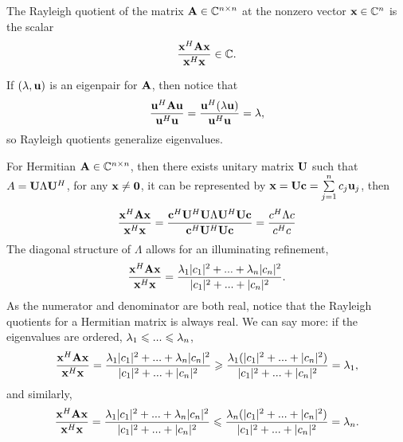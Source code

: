 \begin{definition}{}{}
    The Rayleigh quotient of the matrix $\bold{A}\in \mathbb{C}^{n\times n}$ at the nonzero vector $\bold{x}\in \mathbb{C}^{n}$
    is the scalar
    \begin{align*}
        \frac{\bold{x}^H\bold{A}\bold{x}}{\bold{x}^H\bold{x}}\in \mathbb{C}.
    \end{align*}
\end{definition}
\begin{remark}
    If $(\lambda,\bold{u})$ is an eigenpair for $\bold{A}$, then notice that
    \begin{align*}
        \frac{\bold{u}^H\bold{A}\bold{u}}{\bold{u}^H\bold{u}}=\frac{\bold{u}^H(\lambda \bold{u})}{\bold{u}^H\bold{u}}=\lambda,
    \end{align*}
    so Rayleigh quotients generalize eigenvalues.
\end{remark}
\begin{remark}
    For Hermitian $\bold{A}\in \mathbb{C}^{n\times n}$, 
    then there exists unitary matrix $\bold{U}$ such that $A=\bold{U}\Lambda \bold{U}^H$, 
    for any $\bold{x}\neq \bold{0}$,  it can be represented by $\bold{x}=\bold{U}\bold{c}=\sum\limits_{j=1}^{n}c_j\bold{u}_j$, then 
    \begin{align*}
        \frac{\bold{x}^H\bold{A}\bold{x}}{\bold{x}^H\bold{x}}
        =\frac{\bold{c}^H\bold{U}^H\bold{U}\Lambda \bold{U}^H\bold{U}\bold{c}}{\bold{c}^H\bold{U}^H\bold{U}\bold{c}}
        =\frac{c^H\Lambda c}{c^Hc}
    \end{align*}
    The diagonal
    structure of $\Lambda$ allows for an illuminating refinement,
    \begin{align*}
        \frac{\bold{x}^H\bold{A}\bold{x}}{\bold{x}^H\bold{x}}=\frac{\lambda_1 |c_1|^2+...+\lambda_n |c_n|^2}{|c_1|^2+...+|c_n|^2}.
    \end{align*}
    As the numerator and denominator are both real, notice that the Rayleigh
    quotients for a Hermitian matrix is always real. We can say more: if the eigenvalues are ordered, $\lambda_1\leqslant ... \leqslant \lambda_n$,
    \begin{align*}
        \frac{\bold{x}^H\bold{A}\bold{x}}{\bold{x}^H\bold{x}}=\frac{\lambda_1 |c_1|^2+...+\lambda_n |c_n|^2}{|c_1|^2+...+|c_n|^2}\geqslant \frac{\lambda_1 (|c_1|^2+...+|c_n|^2)}{|c_1|^2+...+|c_n|^2}=\lambda_1,
    \end{align*}
    and similarly,
    \begin{align*}
        \frac{\bold{x}^H\bold{A}\bold{x}}{\bold{x}^H\bold{x}}=\frac{\lambda_1 |c_1|^2+...+\lambda_n |c_n|^2}{|c_1|^2+...+|c_n|^2}\leqslant \frac{\lambda_n (|c_1|^2+...+|c_n|^2)}{|c_1|^2+...+|c_n|^2}=\lambda_n.
    \end{align*}
\end{remark}



